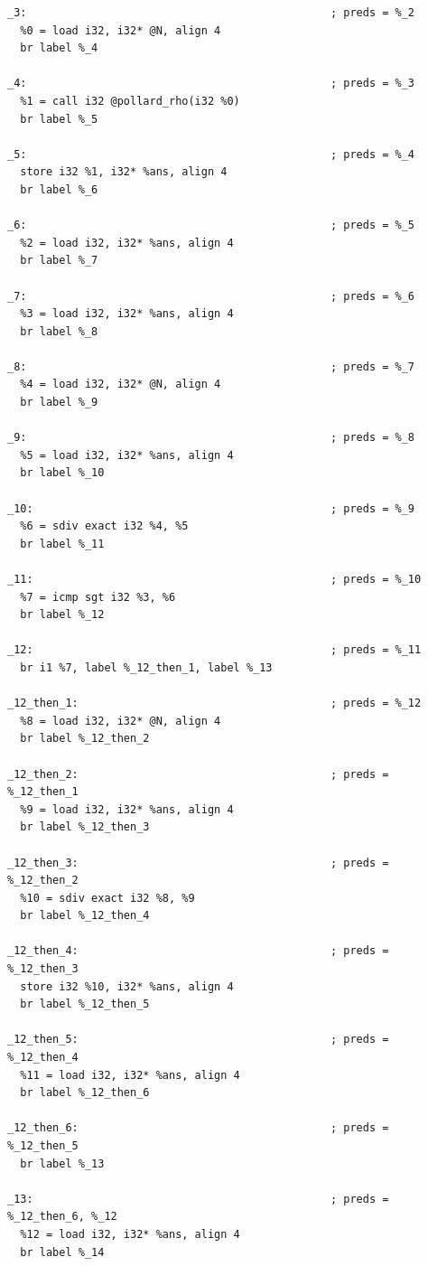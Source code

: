 \documentclass[12pt,a4paper]{article}
\begin{document}
\begin{verbatim}
_3:                                               ; preds = %_2
  %0 = load i32, i32* @N, align 4
  br label %_4

_4:                                               ; preds = %_3
  %1 = call i32 @pollard_rho(i32 %0)
  br label %_5

_5:                                               ; preds = %_4
  store i32 %1, i32* %ans, align 4
  br label %_6

_6:                                               ; preds = %_5
  %2 = load i32, i32* %ans, align 4
  br label %_7

_7:                                               ; preds = %_6
  %3 = load i32, i32* %ans, align 4
  br label %_8

_8:                                               ; preds = %_7
  %4 = load i32, i32* @N, align 4
  br label %_9

_9:                                               ; preds = %_8
  %5 = load i32, i32* %ans, align 4
  br label %_10

_10:                                              ; preds = %_9
  %6 = sdiv exact i32 %4, %5
  br label %_11

_11:                                              ; preds = %_10
  %7 = icmp sgt i32 %3, %6
  br label %_12

_12:                                              ; preds = %_11
  br i1 %7, label %_12_then_1, label %_13

_12_then_1:                                       ; preds = %_12
  %8 = load i32, i32* @N, align 4
  br label %_12_then_2

_12_then_2:                                       ; preds = %_12_then_1
  %9 = load i32, i32* %ans, align 4
  br label %_12_then_3

_12_then_3:                                       ; preds = %_12_then_2
  %10 = sdiv exact i32 %8, %9
  br label %_12_then_4

_12_then_4:                                       ; preds = %_12_then_3
  store i32 %10, i32* %ans, align 4
  br label %_12_then_5

_12_then_5:                                       ; preds = %_12_then_4
  %11 = load i32, i32* %ans, align 4
  br label %_12_then_6

_12_then_6:                                       ; preds = %_12_then_5
  br label %_13

_13:                                              ; preds = %_12_then_6, %_12
  %12 = load i32, i32* %ans, align 4
  br label %_14


\end{verbatim}
\end{document}
